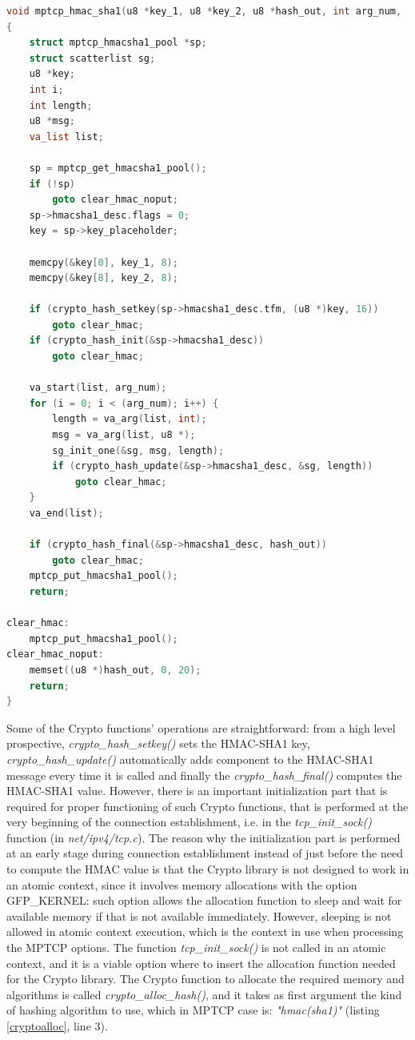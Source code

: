 \begin{lstlisting}[language=c, caption=\textit{mptcp\_hmac\_sha1()} using Linux Kernel Crypto APIs, label=crypto]
void mptcp_hmac_sha1(u8 *key_1, u8 *key_2, u8 *hash_out, int arg_num, ...)
{
	struct mptcp_hmacsha1_pool *sp;
	struct scatterlist sg;
	u8 *key;
	int i;
	int length;
	u8 *msg;
	va_list list;

	sp = mptcp_get_hmacsha1_pool();
	if (!sp)
		goto clear_hmac_noput;
	sp->hmacsha1_desc.flags = 0;
	key = sp->key_placeholder;

	memcpy(&key[0], key_1, 8);
	memcpy(&key[8], key_2, 8);

	if (crypto_hash_setkey(sp->hmacsha1_desc.tfm, (u8 *)key, 16))
		goto clear_hmac;
	if (crypto_hash_init(&sp->hmacsha1_desc))
		goto clear_hmac;

	va_start(list, arg_num);
	for (i = 0; i < (arg_num); i++) {
		length = va_arg(list, int);
		msg = va_arg(list, u8 *);
		sg_init_one(&sg, msg, length);
		if (crypto_hash_update(&sp->hmacsha1_desc, &sg, length))
			goto clear_hmac;
	}
	va_end(list);

	if (crypto_hash_final(&sp->hmacsha1_desc, hash_out))
		goto clear_hmac;
	mptcp_put_hmacsha1_pool();
	return;

clear_hmac:
	mptcp_put_hmacsha1_pool();
clear_hmac_noput:
	memset((u8 *)hash_out, 0, 20);
	return;
}
\end{lstlisting}

Some of the Crypto functions' operations are straightforward: from a high level prospective, \textit{crypto\_hash\_setkey()} sets the HMAC-SHA1 key, \textit{crypto\_hash\_update()} automatically adds component to the HMAC-SHA1 message every time it is called and finally the \textit{crypto\_hash\_final()} computes the HMAC-SHA1 value.
However, there is an important initialization part that is required for proper functioning of such Crypto functions, that is performed at the very beginning of the connection establishment, i.e. in the \textit{tcp\_init\_sock()} function (in \textit{net/ipv4/tcp.c}). The reason why the initialization part is performed at an early stage during connection establishment instead of just before the need to compute the HMAC value is that the Crypto library is not designed to work in an atomic context, since it involves memory allocations with the option GFP\_KERNEL: such option allows the allocation function to sleep and wait for available memory if that is not available immediately. However, sleeping is not allowed in atomic context execution, which is the context in use when processing the MPTCP options. The function \textit{tcp\_init\_sock()} is not called in an atomic context, and it is a viable option where to insert the allocation function needed for the Crypto library. The Crypto function to allocate the required memory and algorithms is called \textit{crypto\_alloc\_hash()}, and it takes as first argument the kind of hashing algorithm to use, which in MPTCP case is: \textit{"hmac(sha1)"} (listing \ref{cryptoalloc}, line 3).

